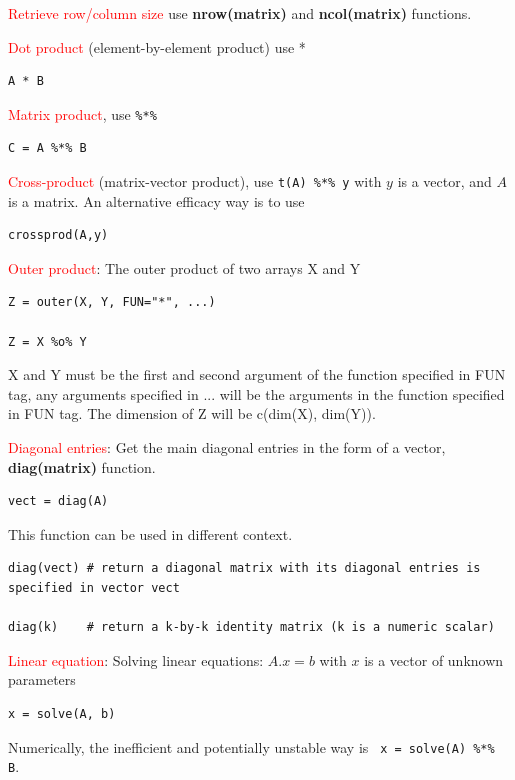 \textcolor{red}{Retrieve row/column size} use {\bf nrow(matrix)} and
{\bf ncol(matrix)} functions.

\textcolor{red}{Dot product} (element-by-element product) use *
\begin{lstlisting}
A * B
\end{lstlisting}

\textcolor{red}{Matrix product}, use \lstinline!%*%!
\begin{lstlisting}
C = A %*% B
\end{lstlisting}

\textcolor{red}{Cross-product} (matrix-vector product), use
\lstinline!t(A) %*% y! with $y$ is a vector,
and $A$ is a matrix. An alternative efficacy way is to use

\begin{lstlisting}
crossprod(A,y)
\end{lstlisting}

\textcolor{red}{Outer product}:  The outer product of two arrays X and Y
\begin{lstlisting}
Z = outer(X, Y, FUN="*", ...)

Z = X %o% Y
\end{lstlisting}
X and Y must be the first and second argument of the function
specified in FUN tag, any arguments specified in ... will be the
arguments in the function specified in FUN tag.  The dimension of Z
will be c(dim(X), dim(Y)).

\textcolor{red}{Diagonal entries}: Get the main diagonal entries in
the form of a vector, {\bf diag(matrix)} function.

\begin{lstlisting}
vect = diag(A)
\end{lstlisting}
This function can be used in different context.

\begin{lstlisting}
diag(vect) # return a diagonal matrix with its diagonal entries is
specified in vector vect

diag(k)    # return a k-by-k identity matrix (k is a numeric scalar)
\end{lstlisting}


\textcolor{red}{Linear equation}: Solving linear equations: $A.x = b$
with $x$ is a vector of unknown parameters
\begin{lstlisting}
x = solve(A, b)
\end{lstlisting}
Numerically, the inefficient and potentially unstable way is
\lstinline! x = solve(A) %*% B!.

